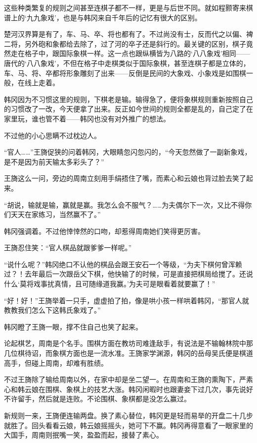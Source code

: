 这些种类繁复的规则之间甚至连棋子都不一样，更是与后世不同。就如程颢寄来棋谱上的‘九九象戏’，也是与韩冈来自千年后的记忆有很大的区别。

楚河汉界算是有了，车、马、卒、将也都有了。不过尚没有士，反而代之以偏、裨二将，另外砲和象都给去除了，过了河的卒子还是斜行的。最关键的区别，棋子竟然走在格子中，跟国际象棋一样。这一点也跟纵横皆为八路的‘八八象戏’相同——唐代的‘八八象戏’，不但在格子中走棋类似于国际象棋，甚至连棋子都是立体的，车、马、将、卒都将形象雕刻了出来——反倒是民间的大象戏、小象戏是如围棋一般，在线上走着。

韩冈因为不习惯这里的规则，下棋老是输。输得急了，便将象棋规则重新按照自己的习惯改了一改，今天便拿了出来。反正如今世间的规则全都是乱的，自己定了在家里玩，谁也管不着——韩冈也没有对外推广的想法。

不过他的小心思瞒不过枕边人。

“官人……”王旖促狭的问着韩冈，大眼睛忽闪忽闪的，“今天忽然做了一副新象戏，是不是因为前天输太多彩头了？”

王旖这么一问，旁边的周南立刻用手绢捂住了嘴，而素心和云娘也背过脸去笑了起来。

“胡说，输就是输，赢就是赢。我怎么会不服气？……为夫偶尔下一次，又比不得你们天天在家练习，当然赢不了。”

韩冈强调着。不过他悻悻然的口吻，却惹得周南她们笑得更厉害。

王旖忍住笑：“官人棋品就跟爹爹一样呢。”

“说什么呢？”韩冈绝口不认他的棋品会跟王安石一个等级，“为夫下棋何曾浑赖过？！去年最后一次跟岳父下棋，他快输了的时候，可是直接把棋局给搅了。还说什么‘莫将戏事扰真情，且可随缘道我赢。’为夫可是眼看着就要赢了！”

“好！好！”王旖举着一只手，虚虚拍了拍，像是哄小孩一样哄着韩冈，“那官人就教教我们怎么下这韩氏象戏了。”

韩冈瞪了王旖一眼，撑不住自己也笑了起来。

论起棋艺，周南是个名手。围棋方面在教坊司难逢敌手，有说法是不输翰林院中那几位棋待诏，而象棋方面也是一流水准。王旖家学渊源，韩冈的岳母吴氏便是棋道高手，但碰上周南，却难有胜绩。

不过王旖除了输给周南以外，在家中却是坐二望一。在周南和王旖的熏陶下，严素心和韩云娘在围棋、象棋上的技艺大涨。韩冈闲暇时也跟妻妾下过几次，事先说好不许留手，然后就是连败。不论围棋、象棋都是没怎么赢过。

新规则一来，王旖便连输两盘。换了素心替位，韩冈更是轻而易举的开盘二十几步就胜了。回头看看云娘，韩云娘摇摇头，她可下不赢。韩冈再得意看了一眼家里的大国手，周南则抿嘴一笑，盈盈而起，接替了素心。

